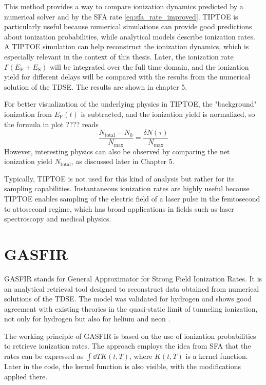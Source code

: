 \bigskip
This method provides a way to compare ionization dynamics predicted by a numerical solver and by the SFA rate \eqref{eq:sfa_rate_improved}.
TIPTOE is particularly useful because numerical simulations can provide good predictions about ionization probabilities, while analytical models describe ionization rates.
A TIPTOE simulation can help reconstruct the ionization dynamics, which is especially relevant in the context of this thesis.
Later, the ionization rate $\Gamma(E_{\mathrm{F}}+E_{\mathrm{S}})$ will be integrated over the full time domain, and the ionization yield for different delays will be compared with the results from the numerical solution of the TDSE.
The results are shown in chapter 5.

For better visualization of the underlying physics in TIPTOE, the "background" ionization from $E_\mathrm{F}(t)$ is subtracted, and the ionization yield is normalized, so the formula in plot ???? reads
\begin{equation*}
    \frac{N_{\mathrm{total}}-N_0}{N_{\mathrm{max}}}=\frac{\delta N(\tau)}{N_{\mathrm{max}}}
\end{equation*}
However, interesting physics can also be observed by comparing the net ionization yield $N_{\mathrm{total}}$, as discussed later in Chapter 5.

Typically, TIPTOE is not used for this kind of analysis but rather for its sampling capabilities.
Instantaneous ionization rates are highly useful because TIPTOE enables sampling of the electric field of a laser pulse in the femtosecond to attosecond regime, which has broad applications in fields such as laser spectroscopy and medical physics.






\section{GASFIR}
GASFIR stands for General Approximator for Strong Field Ionization Rates.
It is an analytical retrieval tool designed to reconstruct data obtained from numerical solutions of the TDSE.
The model was validated for hydrogen and shows good agreement with existing theories in the quasi-static limit of tunneling ionization, not only for hydrogen but also for helium and neon \cite{agarwal2025generalapproximatorstrongfieldionization}.

The working principle of GASFIR is based on the use of ionization probabilities to retrieve ionization rates.
The approach employs the idea from SFA that the rates can be expressed as $\int \dd T K(t,T)$, where $K(t,T)$ is a kernel function.
Later in the code, the kernel function is also visible, with the modifications applied there.

